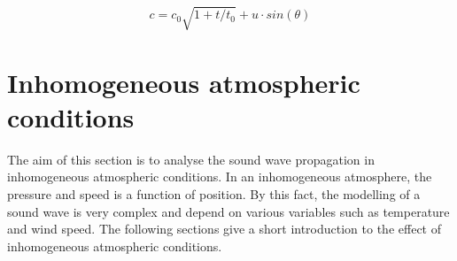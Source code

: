 \begin{equation}\label{eq:ana:wind}
c =  c_0 \sqrt{1+t/t_0} + u \cdot sin(\theta)
\end{equation}  

\startexplain
{}
\stopexplain


 
\section{Inhomogeneous atmospheric conditions} 
The aim of this section is to analyse the sound wave propagation in inhomogeneous atmospheric conditions. In an inhomogeneous atmosphere, the pressure and speed is a function of position. By this fact, the modelling of a sound wave is very complex and depend on various variables such as temperature and wind speed. The following sections give a short introduction to the effect of inhomogeneous atmospheric conditions. 
 
 
